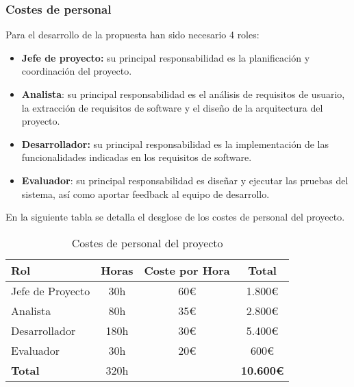 \subsubsection{Costes de personal}
Para el desarrollo de la propuesta han sido necesario 4 roles: 
\begin{itemize}
    \item \textbf{Jefe de proyecto:} su principal responsabilidad es la planificación y coordinación del proyecto.
    \item \textbf{Analista}: su principal responsabilidad es el análisis de requisitos de usuario, la extracción de requisitos de software y el diseño de la arquitectura del proyecto.
    \item \textbf{Desarrollador:} su principal responsabilidad es la implementación de las funcionalidades indicadas en los requisitos de software.
    \item \textbf{Evaluador}: su principal responsabilidad es diseñar y ejecutar las pruebas del sistema, así como aportar feedback al equipo de desarrollo.
\end{itemize}

En la siguiente tabla se detalla el desglose de los costes de personal del proyecto.


\begin{table}[htbp]
    \centering
    \caption{Costes de personal del proyecto}
    \label{tab:costes_personal}
    \begin{tabular}{@{}lccc@{}}
    \toprule
    \textbf{Rol}     & \textbf{Horas} & \textbf{Coste por Hora} & \textbf{Total}   \\ \midrule
    Jefe de Proyecto & 30h            & 60\euro                 & 1.800\euro       \\
    Analista         & 80h            & 35\euro                 & 2.800\euro       \\
    Desarrollador    & 180h           & 30\euro                 & 5.400\euro       \\
    Evaluador        & 30h            & 20\euro                 & 600\euro         \\ \midrule
    \textbf{Total}   & 320h           &                         & \textbf{10.600\euro} \\ \bottomrule
    \end{tabular}
\end{table}

